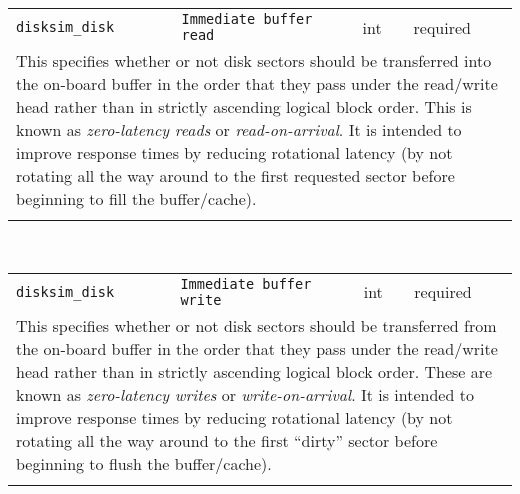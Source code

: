 \noindent 
\begin{tabular}{|p{\lpmodwidth}|p{\lpnamewidth}|p{0.5in}|p{0.5in}|}
\cline{1-4}
\texttt{disksim\_disk} & \texttt{Immediate buffer read} & int & required \\ 
\cline{1-4}
\multicolumn{4}{|p{6in}|}{
This specifies whether or not disk sectors should be transferred into the
on-board buffer in the order that they pass under the read/write head
rather than in strictly ascending logical block order. This is known
as {\it zero-latency reads} or {\it read-on-arrival}. It is intended
to improve response times by reducing rotational latency (by not
rotating all the way around to the first requested sector before
beginning to fill the buffer/cache).
}\\ 
\cline{1-4}
\multicolumn{4}{p{5in}}{}\\
\end{tabular}\\ 
\noindent 
\begin{tabular}{|p{\lpmodwidth}|p{\lpnamewidth}|p{0.5in}|p{0.5in}|}
\cline{1-4}
\texttt{disksim\_disk} & \texttt{Immediate buffer write} & int & required \\ 
\cline{1-4}
\multicolumn{4}{|p{6in}|}{
This specifies whether or not disk sectors should be transferred from the
on-board buffer in the order that they pass under the read/write head
rather than in strictly ascending logical block order. These are known
as {\it zero-latency writes} or {\it write-on-arrival}. It is
intended to improve response times by reducing rotational latency (by
not rotating all the way around to the first ``dirty'' sector before
beginning to flush the buffer/cache).
}\\ 
\cline{1-4}
\multicolumn{4}{p{5in}}{}\\
\end{tabular}\\ 
